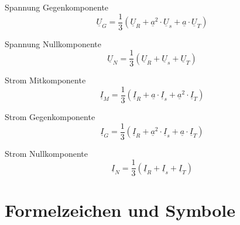 \documentclass[11pt, a4paper, draft, fleqn, twocolumn]{article}
\numberwithin{equation}{subsection}
\begin{document}
\noindent Spannung Gegenkomponente
\begin{equation}
    \underline{U}_G = \frac{1}{3}(\underline{U}_R + \underline{a}^2 \cdot \underline{U}_s + \underline{a} \cdot \underline{U}_T)
\end{equation}

\noindent Spannung Nullkomponente
\begin{equation}
    \underline{U}_N = \frac{1}{3}(\underline{U}_R + \underline{U}_s + \underline{U}_T)
\end{equation}

\noindent Strom Mitkomponente
\begin{equation}
    \underline{I}_M = \frac{1}{3}(\underline{I}_R + \underline{a} \cdot \underline{I}_s + \underline{a}^2 \cdot \underline{I}_T)
\end{equation}

\noindent Strom Gegenkomponente
\begin{equation}
    \underline{I}_G = \frac{1}{3}(\underline{I}_R + \underline{a}^2 \cdot \underline{I}_s + \underline{a} \cdot \underline{I}_T)
\end{equation}

\noindent Strom Nullkomponente
\begin{equation}
    \underline{I}_N = \frac{1}{3}(\underline{I}_R + \underline{I}_s + \underline{I}_T)
\end{equation}



\section{Formelzeichen und Symbole}
\end{document}
